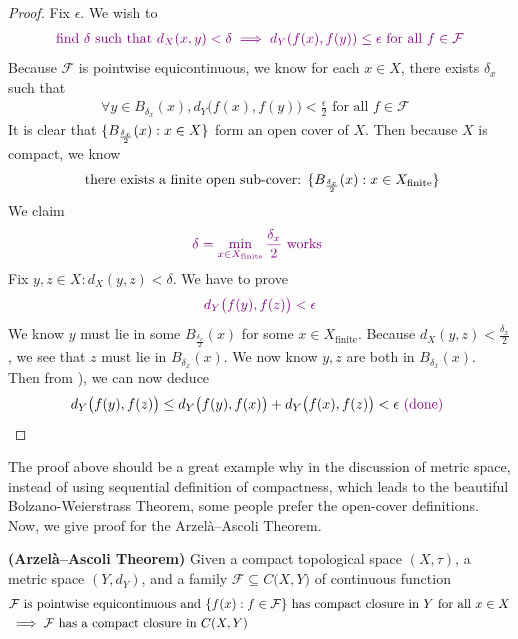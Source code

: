 \documentclass{report}
\begin{document}
\begin{proof}
Fix $\epsilon $. We wish to 
\begin{align*}
\textcolor{violet}{\text{ find $\delta$ such that $d_X(x,y)<\delta \implies d_Y(f(x),f(y))\leq \epsilon $ for all $f \in \mathcal{F}$ }}
\end{align*}
Because $\mathcal{F}$ is pointwise equicontinuous, we know for each $x \in X$, there exists $\delta_x$ such that 
\begin{align}
\label{PEe1}
\forall y\in B_{\delta_x}(x), d_Y\big(f(x),f(y) \big)<\frac{\epsilon}{2} \text{ for all $f\in \mathcal{F}$ }
\end{align}
It is clear that $\{ B_{\frac{\delta_x}{2}}(x):x \in X \}$ form an open cover of $X$. Then because  $X$ is compact, we know  
 \begin{align*}
\text{ there exists a finite open sub-cover: }\{ B_{\frac{\delta_x}{2}}(x):x \in X_{\text{finite}} \}
\end{align*}
We claim 
\begin{align*}
\textcolor{violet}{\delta=\min_{x \in X_{\text{finite}}}\frac{\delta_x}{2}\text{ works }}
\end{align*}
Fix $y,z \in X: d_X(y,z)<\delta$. We have to prove 
\begin{align*}
\textcolor{violet}{d_Y\big(f(y),f(z) \big)< \epsilon }
\end{align*}
We know $y$ must lie in some  $B_\frac{\delta_x}{2}(x)$ for some $x \in X_\text{finite}$. Because $d_X(y,z)<\frac{\delta_x}{2}$, we see that $z$ must lie in  $B_{\delta_x}(x)$. We now know $y,z$ are both in  $B_{\delta_x}(x)$. Then from ), we can now deduce 
\begin{align*}
d_Y\big(f(y),f(z) \big)\leq d_Y\big(f(y),f(x) \big)+d_Y\big(f(x),f(z) \big)< \epsilon \textcolor{violet}{\text{ (done) }}
\end{align*}
\end{proof}
\begin{mdframed}
The proof above should be a great example why in the discussion of metric space, instead of using sequential definition of compactness, which leads to the beautiful Bolzano-Weierstrass Theorem, some people prefer the open-cover definitions.\\

Now, we give proof for the Arzelà–Ascoli Theorem. 
\end{mdframed}
\begin{theorem}
\textbf{(Arzelà–Ascoli Theorem)} Given a compact topological space $(X,\tau)$, a metric space $(Y,d_Y)$, and a family $\mathcal{F}\subseteq C\big(X,Y \big)$ of continuous function  
 \begin{align*}
&\mathcal{F}\text{ is pointwise equicontinuous and $\{ f(x):f \in \mathcal{F} \}$ has compact closure in $Y$ for all $x \in X$}\\
&\implies \mathcal{F}\text{ has a compact closure in $C(X,Y)$}
\end{align*}
\end{theorem}
\end{document}

